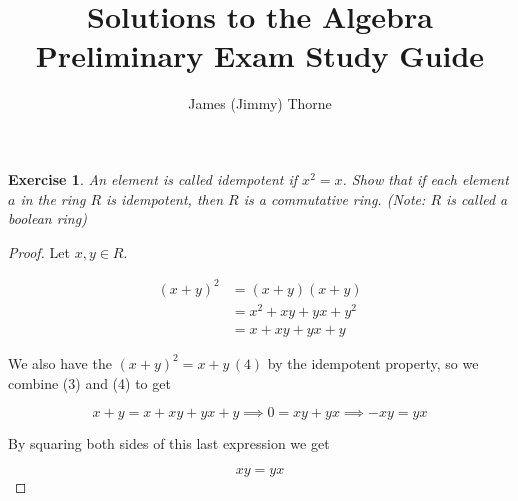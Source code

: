 \documentclass[12pt]{book}
\title{Solutions to the Algebra Preliminary Exam Study Guide}
\author{James (Jimmy) Thorne}
\newtheorem{ex}{Exercise}
\begin{document}
	\maketitle
	
	\begin{ex}
		An element is called idempotent if $x^2=x$.  Show that if each element $a$
		in the ring $R$
		is idempotent, then $R$ is a commutative ring.  (Note: $R$ is called a
		boolean ring)
	\end{ex}

	\begin{proof}
		Let $x,y\in R$.
		
		\begin{align}
			(x+y)^2 &= (x+y)(x+y) \\
			&= x^2 + xy + yx + y^2 \\
			&= x + xy + yx +y 
		\end{align}
		
		We also have the $(x+y)^2=x+y \, (4)$ by the idempotent property,
		so we combine (3) and (4)  to get
		
		$$x + y = x + xy + yx + y \implies 0 = xy + yx \implies -xy = yx $$
		
		By squaring both sides of this last expression we get
		
		$$xy = yx$$
		
		
	\end{proof}
	
\end{document}
